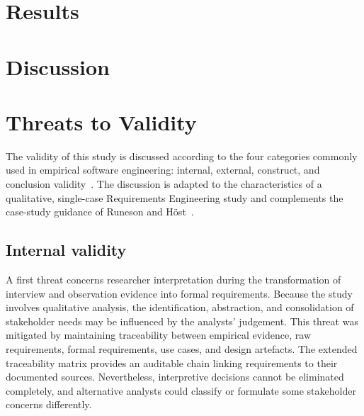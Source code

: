 \documentclass[pdflatex,sn-mathphys-num,Numbered]{sn-jnl}
\begin{document}

\section{Results}\label{sec4}


\section{Discussion}\label{sec5}


\section{Threats to Validity}\label{sec6}

The validity of this study is discussed according to the four categories commonly used in empirical software engineering: internal, external, construct, and conclusion validity~\cite{wohlin2012}. The discussion is adapted to the characteristics of a qualitative, single-case Requirements Engineering study and complements the case-study guidance of Runeson and H\"ost~\cite{runeson2009}.

\subsection{Internal validity}\label{tv:internal}

A first threat concerns researcher interpretation during the transformation of interview and observation evidence into formal requirements. Because the study involves qualitative analysis, the identification, abstraction, and consolidation of stakeholder needs may be influenced by the analysts' judgement. This threat was mitigated by maintaining traceability between empirical evidence, raw requirements, formal requirements, use cases, and design artefacts. The extended traceability matrix provides an auditable chain linking requirements to their documented sources. Nevertheless, interpretive decisions cannot be eliminated completely, and alternative analysts could classify or formulate some stakeholder concerns differently.
\end{document}
